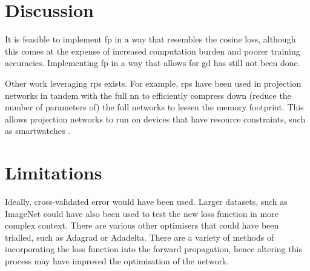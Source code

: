 \section{Discussion}

It is feasible to implement \gls{fp} in a way that resembles the cosine loss, although this comes at the expense of increased computation burden and poorer training accuracies. Implementing \gls{fp} in a way that allows for \gls{gd} has still not been done.
\bigskip

Other work leveraging \gls{rp}s exists. For example, \gls{rp}s have been used in projection networks in tandem with the full \gls{nn} to efficiently compress down (reduce the number of parameters of) the full networks to lessen the memory footprint. This allows projection networks to run on devices that have resource constraints, such as smartwatches \cite{projection_net}. 
\bigskip

\section{Limitations}

Ideally, cross-validated error would have been used. Larger datasets, such as ImageNet could have also been used to test the new loss function in more complex context. There are various other optimisers that could have been trialled, such as Adagrad or Adadelta. There are a variety of methods of incorporating the loss function into the forward propagation, hence altering this process may have improved the optimisation of the network.
